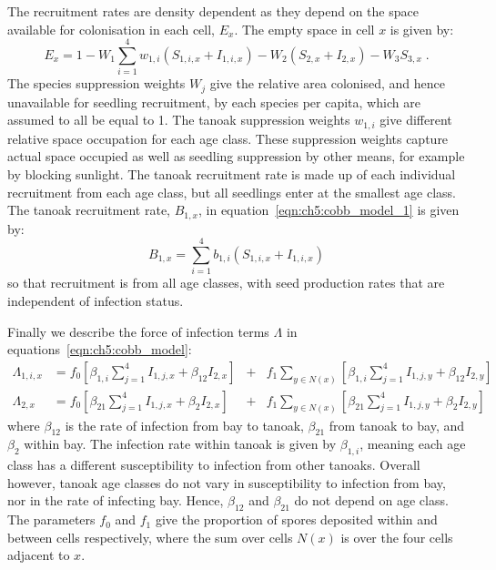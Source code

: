 The recruitment rates are density dependent as they depend on the space available for colonisation in each cell, $E_x$. The empty space in cell $x$ is given by:
\begin{equation}
    E_x = 1 - W_1\sum_{i=1}^4w_{1,i}\left(S_{1,i,x} + I_{1,i,x}\right) - W_2\left(S_{2,x} + I_{2,x}\right) - W_3S_{3,x} \;.
\end{equation}
The species suppression weights $W_j$ give the relative area colonised, and hence unavailable for seedling recruitment, by each species per capita, which are assumed to all be equal to 1. The tanoak suppression weights $w_{1,i}$ give different relative space occupation for each age class. These suppression weights capture actual space occupied as well as seedling suppression by other means, for example by blocking sunlight. The tanoak recruitment rate is made up of each individual recruitment from each age class, but all seedlings enter at the smallest age class. The tanoak recruitment rate, $B_{1,x}$, in equation~\ref{eqn:ch5:cobb_model_1} is given by:
\begin{equation}\label{eqn:ch5:tanoak_recruit}
    B_{1,x} = \sum_{i=1}^4b_{1,i}\left(S_{1,i,x} + I_{1,i,x}\right)
\end{equation}
so that recruitment is from all age classes, with seed production rates that are independent of infection status.

Finally we describe the force of infection terms $\Lambda$ in equations~\ref{eqn:ch5:cobb_model}:
\begin{subequations}\label{eqn:ch5:infection}
    \begin{alignat}{5}
        \Lambda_{1,i,x} &= f_0\left[\beta_{1,i}\sum_{j=1}^4I_{1,j,x} + \beta_{12}I_{2,x}\right] &+& f_1\sum_{y\in N(x)}\left[\beta_{1,i}\sum_{j=1}^4I_{1,j,y} + \beta_{12}I_{2,y}\right] \label{eqn:ch5:infection_1}\\
        \Lambda_{2,x} &= f_0\left[\beta_{21}\sum_{j=1}^4I_{1,j,x} + \beta_{2}I_{2,x}\right] &+& f_1\sum_{y\in N(x)}\left[\beta_{21}\sum_{j=1}^4I_{1,j,y} + \beta_{2}I_{2,y}\right] \label{eqn:ch5:infection_2}
    \end{alignat}
\end{subequations}
where $\beta_{12}$ is the rate of infection from bay to tanoak, $\beta_{21}$ from tanoak to bay, and $\beta_{2}$ within bay. The infection rate within tanoak is given by $\beta_{1,i}$, meaning each age class has a different susceptibility to infection from other tanoaks. Overall however, tanoak age classes do not vary in susceptibility to infection from bay, nor in the rate of infecting bay. Hence, $\beta_{12}$ and $\beta_{21}$ do not depend on age class. The parameters $f_0$ and $f_1$ give the proportion of spores deposited within and between cells respectively, where the sum over cells $N(x)$ is over the four cells adjacent to $x$.

